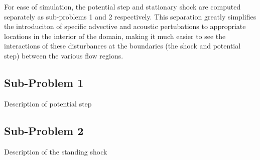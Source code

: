 For ease of simulation, the potential step and stationary shock are computed separately as sub-problems 1 and 2 respectively. This separation greatly simplifies the introduciton of specific advective and acoustic pertubations to appropriate locations in the interior of the domain, making it much easier to see the interactions of these disturbances at the boundaries (the shock and potential step) between the various flow regions.


\subsection{Sub-Problem 1}

Description of potential step

\subsection{Sub-Problem 2}

Description of the standing shock